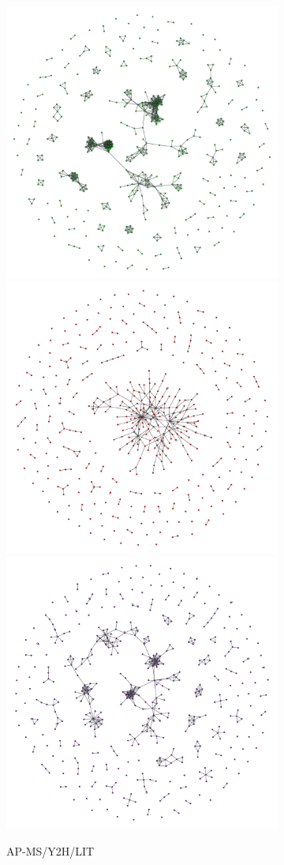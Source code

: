 \vspace{1.5cm}
\begin{figure}[!ht]
    \centering
    \begin{subfigure}[b]{0.48\columnwidth}
        \centering
        \includegraphics[width=.45\textwidth]{./schemes/subgrafo_AP-MS_all-gml.pdf}
        \includegraphics[width=.45\textwidth]{./schemes/subgrafo_Y2H_all-gml.pdf}\\
        \includegraphics[width=.45\textwidth]{./schemes/subgrafo_LIT_all-gml.pdf}
        \caption{\label{fig:all} AP-MS/Y2H/LIT}
    \end{subfigure}
    \hfill
    \begin{subfigure}[b]{0.48\columnwidth}

\end{subfigure}
\end{figure}
